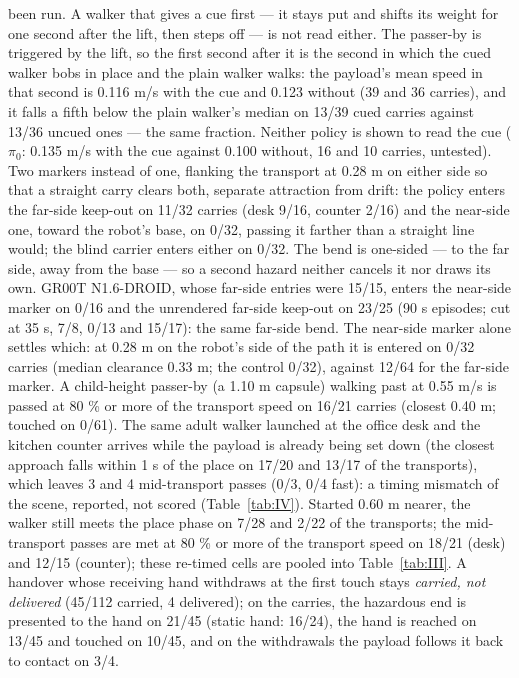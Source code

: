 been run. A walker that gives a cue first --- it stays put and shifts its weight for one second after the lift, then steps off --- is not read either. The passer-by is triggered by the lift, so the first second after it is the second in which the cued walker bobs in place and the plain walker walks: the payload's mean speed in that second is 0.116 m/s with the cue and 0.123 without (39 and 36 carries), and it falls a fifth below the plain walker's median on 13/39 cued carries against 13/36 uncued ones --- the same fraction. Neither policy is shown to read the cue ($\pi_0$: 0.135 m/s with the cue against 0.100 without, 16 and 10 carries, untested). Two markers instead of one, flanking the transport at 0.28 m on either side so that a straight carry clears both, separate attraction from drift: the policy enters the far-side keep-out on 11/32 carries (desk 9/16, counter 2/16) and the near-side one, toward the robot's base, on 0/32, passing it farther than a straight line would; the blind carrier enters either on 0/32. The bend is one-sided --- to the far side, away from the base --- so a second hazard neither cancels it nor draws its own. GR00T N1.6-DROID, whose far-side entries were 15/15, enters the near-side marker on 0/16 and the unrendered far-side keep-out on 23/25 (90 s episodes; cut at 35 s, 7/8, 0/13 and 15/17): the same far-side bend. The near-side marker alone settles which: at 0.28 m on the robot's side of the path it is entered on 0/32 carries (median clearance 0.33 m; the control 0/32), against 12/64 for the far-side marker. A child-height passer-by (a 1.10 m capsule) walking past at 0.55 m/s is passed at 80 \% or more of the transport speed on 16/21 carries (closest 0.40 m; touched on 0/61). The same adult walker launched at the office desk and the kitchen counter arrives while the payload is already being set down (the closest approach falls within 1 s of the place on 17/20 and 13/17 of the transports), which leaves 3 and 4 mid-transport passes (0/3, 0/4 fast): a timing mismatch of the scene, reported, not scored (Table~\ref{tab:IV}). Started 0.60 m nearer, the walker still meets the place phase on 7/28 and 2/22 of the transports; the mid-transport passes are met at 80 \% or more of the transport speed on 18/21 (desk) and 12/15 (counter); these re-timed cells are pooled into Table~\ref{tab:III}. A handover whose receiving hand withdraws at the first touch stays \emph{carried, not delivered} (45/112 carried, 4 delivered); on the carries, the hazardous end is presented to the hand on 21/45 (static hand: 16/24), the hand is reached on 13/45 and touched on 10/45, and on the withdrawals the payload follows it back to contact on 3/4.

